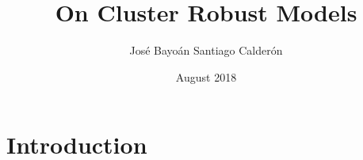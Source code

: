 \documentclass{article}
\title{On Cluster Robust Models}
\author{José Bayoán Santiago Calderón}
\date{August 2018}
\begin{document}
\maketitle

\section{Introduction}
\end{document}
